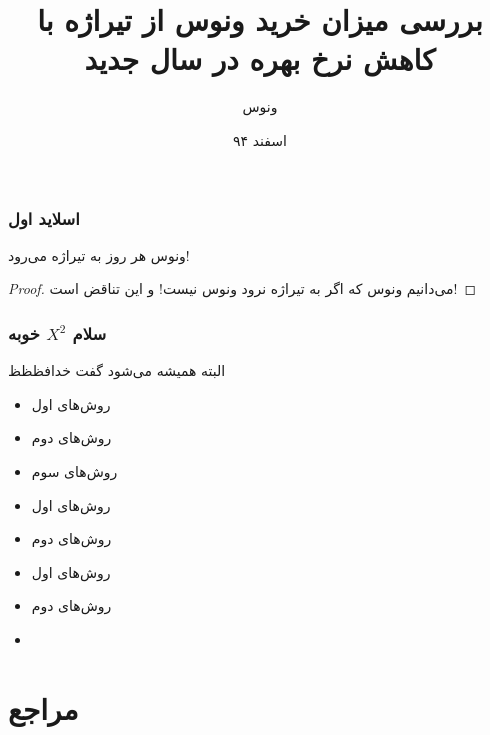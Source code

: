 \documentclass[''serif'', xetex, pagebackref=true,colorlinks=blue, linkcolor=red, citecolor=magenta, fleqns, Persian]{beamer}
\author{ونوس}
\title{بررسی میزان خرید ونوس از تیراژه با کاهش نرخ بهره در سال جدید}
\date{اسفند ۹۴}
\begin{document}
	\begin{frame}
		\maketitle
	\end{frame}
	
	\begin{frame}	\raggedright
	\frametitle{اسلاید اول}
	\begin{theorem}
 ونوس هر روز به تیراژه می‌رود!
	\end{theorem}
	\begin{proof}
می‌دانیم ونوس که اگر به تیراژه نرود ونوس نیست! و این تناقض است!
	\end{proof}
	\end{frame}


	\begin{frame}
	\frametitle{ سلام $X^2$ خوبه}
\begin{flushright}
البته همیشه می‌شود گفت		خدافظظظ


\begin{itemize} \raggedleft
	\item 
	روش‌های اول
	\item
	روش‌های دوم
	\item
	روش‌های سوم
		\item 
	روش‌های اول
	\item
	روش‌های دوم
	\item 
	روش‌های اول
	\item
	روش‌های دوم
	\item

\end{itemize}
	
\end{flushright}

\end{frame}
\section{مراجع}
\end{document}
